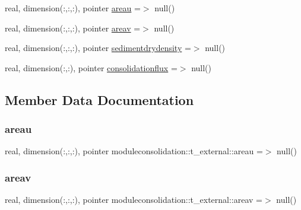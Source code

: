 \begin{DoxyCompactItemize}
\item 
real, dimension(\+:,\+:,\+:), pointer \mbox{\hyperlink{structmoduleconsolidation_1_1t__external_af3ed18a7c229d2b24ce30edad585b87b}{areau}} =$>$ null()
\item 
real, dimension(\+:,\+:,\+:), pointer \mbox{\hyperlink{structmoduleconsolidation_1_1t__external_ac54bf060374f239267efaa5d470d7fdb}{areav}} =$>$ null()
\item 
real, dimension(\+:,\+:,\+:), pointer \mbox{\hyperlink{structmoduleconsolidation_1_1t__external_ae451a42a0d25534921585079c43ec58e}{sedimentdrydensity}} =$>$ null()
\item 
real, dimension(\+:,\+:), pointer \mbox{\hyperlink{structmoduleconsolidation_1_1t__external_ab475698ee1980b2a6a77d5d11e927b75}{consolidationflux}} =$>$ null()
\end{DoxyCompactItemize}


\subsection{Member Data Documentation}
\mbox{\label{structmoduleconsolidation_1_1t__external_af3ed18a7c229d2b24ce30edad585b87b}} 
\subsubsection{\texorpdfstring{areau}{areau}}
{\footnotesize\ttfamily real, dimension(\+:,\+:,\+:), pointer moduleconsolidation\+::t\+\_\+external\+::areau =$>$ null()\hspace{0.3cm}{\ttfamily [private]}}

\mbox{\label{structmoduleconsolidation_1_1t__external_ac54bf060374f239267efaa5d470d7fdb}} 
\subsubsection{\texorpdfstring{areav}{areav}}
{\footnotesize\ttfamily real, dimension(\+:,\+:,\+:), pointer moduleconsolidation\+::t\+\_\+external\+::areav =$>$ null()\hspace{0.3cm}{\ttfamily [private]}}

